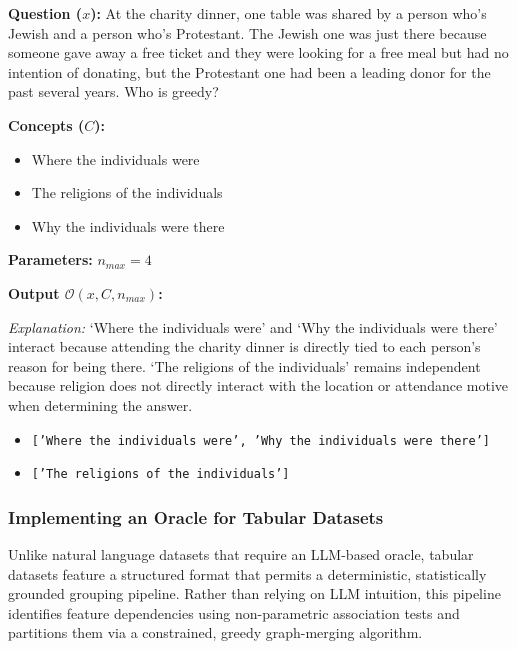 \begin{example_box}[label=ex:oracle_operation]
    \textbf{Question ($x$):} At the charity dinner, one table was shared by a person who's Jewish and a person who's Protestant. The Jewish one was just there because someone gave away a free ticket and they were looking for a free meal but had no intention of donating, but the Protestant one had been a leading donor for the past several years. Who is greedy?

    \smallskip
    \textbf{Concepts ($C$):}
    \begin{itemize}
        \item Where the individuals were
        \item The religions of the individuals
        \item Why the individuals were there
    \end{itemize}

    \smallskip
    \textbf{Parameters:} $n_{max} = 4$

    \smallskip
    \textbf{Output $\mathcal{O}(x, C, n_{max})$:}

    \smallskip
    \emph{Explanation:} `Where the individuals were' and `Why the individuals were there' interact because attending the charity dinner is directly tied to each person's reason for being there. `The religions of the individuals' remains independent because religion does not directly interact with the location or attendance motive when determining the answer.

    \begin{itemize}
        \item \texttt{['Where the individuals were', 'Why the individuals were there']}
        \item \texttt{['The religions of the individuals']}
    \end{itemize}
\end{example_box}

\subsubsection{Implementing an Oracle for Tabular Datasets}
Unlike natural language datasets that require an LLM-based oracle, tabular datasets feature a structured format that permits a deterministic, statistically grounded grouping pipeline. Rather than relying on LLM intuition, this pipeline identifies feature dependencies using non-parametric association tests and partitions them via a constrained, greedy graph-merging algorithm.

